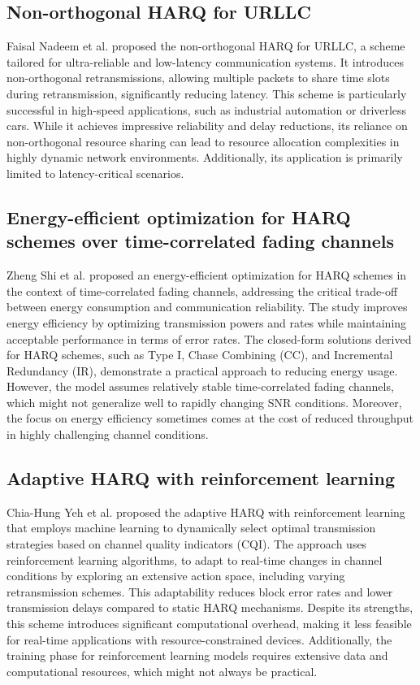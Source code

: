 \documentclass[sn-mathphys-num]{sn-jnl}
\theoremstyle{thmstyleone}
\theoremstyle{thmstyletwo}%
\theoremstyle{thmstylethree}%
\begin{document}
\subsection{Non-orthogonal HARQ for URLLC} \label{s2.4}

Faisal Nadeem et al. \cite{r28} proposed the non-orthogonal HARQ for URLLC, a scheme tailored for ultra-reliable and low-latency communication systems. It introduces non-orthogonal retransmissions, allowing multiple packets to share time slots during retransmission, significantly reducing latency. This scheme is particularly successful in high-speed applications, such as industrial automation or driverless cars. While it achieves impressive reliability and delay reductions, its reliance on non-orthogonal resource sharing can lead to resource allocation complexities in highly dynamic network environments. Additionally, its application is primarily limited to latency-critical scenarios.

\subsection{Energy-efficient optimization for HARQ schemes over time-correlated fading channels} \label{s2.5}

Zheng Shi et al. \cite{r29} proposed an energy-efficient optimization for HARQ schemes in the context of time-correlated fading channels, addressing the critical trade-off between energy consumption and communication reliability. The study improves energy efficiency by optimizing transmission powers and rates while maintaining acceptable performance in terms of error rates. The closed-form solutions derived for HARQ schemes, such as Type I, Chase Combining (CC), and Incremental Redundancy (IR), demonstrate a practical approach to reducing energy usage. However, the model assumes relatively stable time-correlated fading channels, which might not generalize well to rapidly changing SNR conditions. Moreover, the focus on energy efficiency sometimes comes at the cost of reduced throughput in highly challenging channel conditions.

\subsection{Adaptive HARQ with reinforcement learning} \label{s2.6}

Chia-Hung Yeh et al. \cite{r30} proposed the adaptive HARQ with reinforcement learning that employs machine learning to dynamically select optimal transmission strategies based on channel quality indicators (CQI). The approach uses reinforcement learning algorithms, to adapt to real-time changes in channel conditions by exploring an extensive action space, including varying retransmission schemes. This adaptability reduces block error rates and lower transmission delays compared to static HARQ mechanisms. Despite its strengths, this scheme introduces significant computational overhead, making it less feasible for real-time applications with resource-constrained devices. Additionally, the training phase for reinforcement learning models requires extensive data and computational resources, which might not always be practical.
\end{document}
